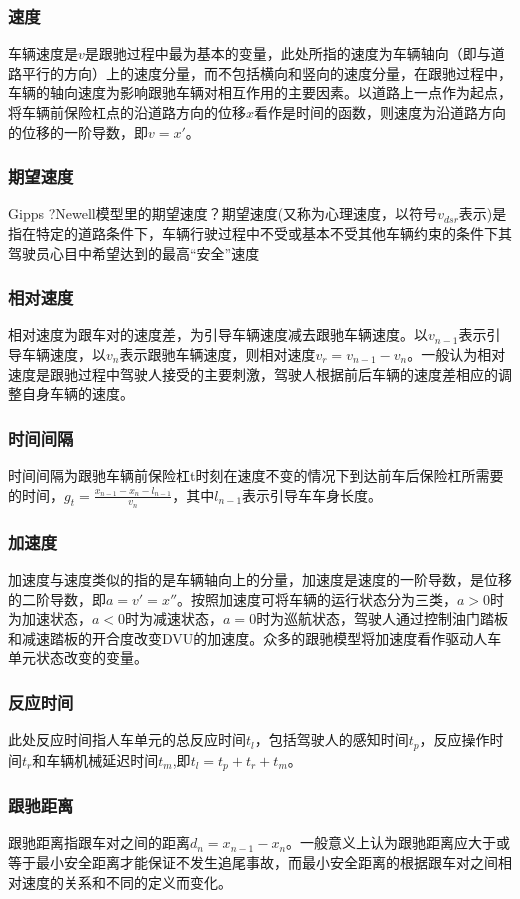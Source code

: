 \subsubsection{速度}
车辆速度是$v$是跟驰过程中最为基本的变量，此处所指的速度为车辆轴向（即与道路平行的方向）上的速度分量，而不包括横向和竖向的速度分量，在跟驰过程中，车辆的轴向速度为影响跟驰车辆对相互作用的主要因素。以道路上一点作为起点，将车辆前保险杠点的沿道路方向的位移$x$看作是时间的函数，则速度为沿道路方向的位移的一阶导数，即$v=x'$。
\subsubsection{期望速度}
Gipps ?Newell模型里的期望速度？期望速度(又称为心理速度，以符号$v_{dsr}$表示)是指在特定的道路条件下，车辆行驶过程中不受或基本不受其他车辆约束的条件下其驾驶员心目中希望达到的最高“安全”速度
\subsubsection{相对速度}
相对速度为跟车对的速度差，为引导车辆速度减去跟驰车辆速度。以$v_{n-1}$表示引导车辆速度，以$v_n$表示跟驰车辆速度，则相对速度$v_r=v_{n-1}-v_n$。一般认为相对速度是跟驰过程中驾驶人接受的主要刺激，驾驶人根据前后车辆的速度差相应的调整自身车辆的速度。
\subsubsection{时间间隔}
时间间隔为跟驰车辆前保险杠t时刻在速度不变的情况下到达前车后保险杠所需要的时间，$g_t=\frac{x_{n-1}-x_n-l_{n-1}}{v_n}$，其中$l_{n-1}$表示引导车车身长度。


\subsubsection{加速度}
加速度与速度类似的指的是车辆轴向上的分量，加速度是速度的一阶导数，是位移的二阶导数，即$a=v'=x''$。按照加速度可将车辆的运行状态分为三类，$a>0$时为加速状态，$a<0$时为减速状态，$a=0$时为巡航状态，驾驶人通过控制油门踏板和减速踏板的开合度改变DVU的加速度。众多的跟驰模型将加速度看作驱动人车单元状态改变的变量。
\subsubsection{反应时间}
此处反应时间指人车单元的总反应时间$t_l$，包括驾驶人的感知时间$t_p$，反应操作时间$t_r$和车辆机械延迟时间$t_m$,即$t_l=t_p+t_r+t_m$。
\subsubsection{跟驰距离}
跟驰距离指跟车对之间的距离$d_n=x_{n-1}-x_n$。一般意义上认为跟驰距离应大于或等于最小安全距离才能保证不发生追尾事故，而最小安全距离的根据跟车对之间相对速度的关系和不同的定义而变化。
